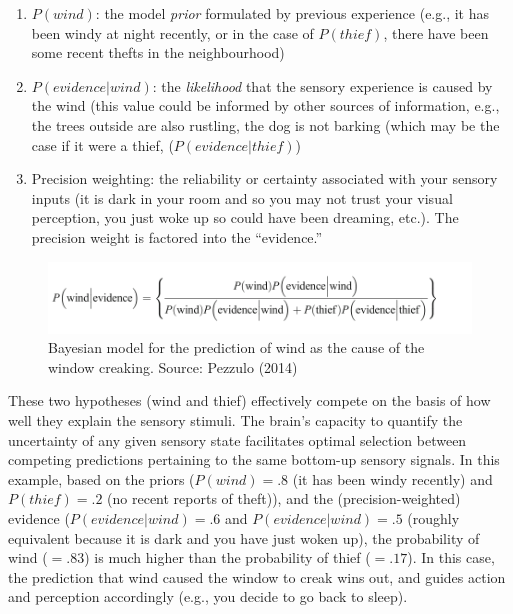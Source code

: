 \begin{CJK}{UTF8}{gbsn}
\begin{enumerate}
\item $P(wind)$: the model \textit{prior} formulated by previous experience (e.g., it has been windy at night recently, or in the case of $P(thief)$, there have been some recent thefts in the neighbourhood)
\item $P(evidence|wind)$: the \textit{likelihood} that the sensory experience is caused by the wind (this value could be informed by other sources of information, e.g., the trees outside are also rustling, the dog is not barking (which may be the case if it were a thief, ($P(evidence|thief)$)
\item Precision weighting: the reliability or certainty associated with your sensory inputs (it is dark in your room and so you may not trust your visual perception, you just woke up so could have been dreaming, etc.).  The precision weight is factored into the ``evidence.''
\end{enumerate}

      \begin{figure}[htbp]
      \begin{center}
      \includegraphics[scale=.5]{images/windThief.png}
        \caption{Bayesian model for the prediction of wind as the cause of the window creaking. Source: Pezzulo (2014)}
          \label{fig:windThief}
      \end{center}
      \end{figure}

These two hypotheses (wind and thief) effectively compete on the basis of how well they explain the sensory stimuli.  The brain's capacity to quantify the uncertainty of any given sensory state facilitates optimal selection between competing predictions pertaining to the same bottom-up sensory signals.  In this example, based on the priors ($P(wind) = .8$ (it has been windy recently) and $P(thief) = .2$ (no recent reports of theft)), and the (precision-weighted) evidence ($P(evidence|wind) = .6$ and $P(evidence|wind) = .5$ (roughly equivalent because it is dark and you have just woken up), the probability of wind ($= .83$) is much higher than the probability of thief ($= .17$).  In this case, the prediction that wind caused the window to creak wins out, and guides action and perception accordingly (e.g., you decide to go back to sleep).


\end{CJK}
